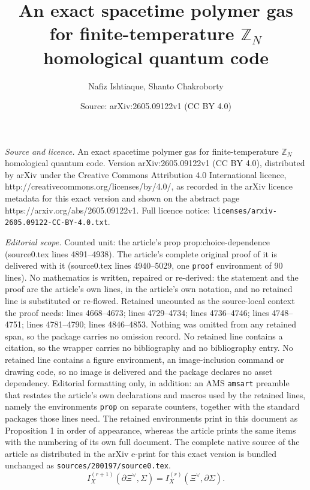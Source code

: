 \documentclass[10pt,a4paper]{amsart}
\title{An exact spacetime polymer gas for finite-temperature $\mathbb Z_N$ homological quantum code}
\author{Nafiz Ishtiaque, Shanto Chakroborty}
\date{Source: arXiv:2605.09122v1 (CC BY 4.0)}
\begin{document}
\maketitle

\noindent\emph{Source and licence.} An exact spacetime polymer gas for finite-temperature $\mathbb Z_N$ homological quantum code. Version arXiv:2605.09122v1 (CC BY 4.0), distributed by arXiv under the Creative Commons Attribution 4.0 International licence, http://creativecommons.org/licenses/by/4.0/, as recorded in the arXiv licence metadata for this exact version and shown on the abstract page https://arxiv.org/abs/2605.09122v1. Full licence notice: \texttt{licenses/arxiv-2605.09122-CC-BY-4.0.txt}.\par\smallskip

\noindent\textit{Editorial scope.} Counted unit: the article's prop prop:choice-dependence (source0.tex lines 4891--4938). The article's complete original proof of it is delivered with it (source0.tex lines 4940--5029, one \texttt{proof} environment of 90 lines). No mathematics is written, repaired or re-derived: the statement and the proof are the article's own lines, in the article's own notation, and no retained line is substituted or re-flowed.  Retained uncounted as the source-local context the proof needs: lines 4668--4673; lines 4729--4734; lines 4736--4746; lines 4748--4751; lines 4781--4790; lines 4846--4853.  Nothing was omitted from any retained span, so the package carries no omission record.  No retained line contains a citation, so the wrapper carries no bibliography and no bibliography entry.  No retained line contains a figure environment, an image-inclusion command or drawing code, so no image is delivered and the package declares no asset dependency.  Editorial formatting only, in addition: an AMS \texttt{amsart} preamble that restates the article's own declarations and macros used by the retained lines, namely the environments \texttt{prop} on separate counters, together with the standard packages those lines need.  The retained environments print in this document as Proposition 1 in order of appearance, whereas the article prints the same items with the numbering of its own full document.  The complete native source of the article as distributed in the arXiv e-print for this exact version is bundled unchanged as \texttt{sources/200197/source0.tex}.
\begin{equation}
	I_X^{(r+1)}(\partial \Xi^\vee,\Sigma)
	=
	I_X^{(r)}(\Xi^\vee,\partial \Sigma).
	\label{eq:intersection-Stokes}
\end{equation}
\end{document}
